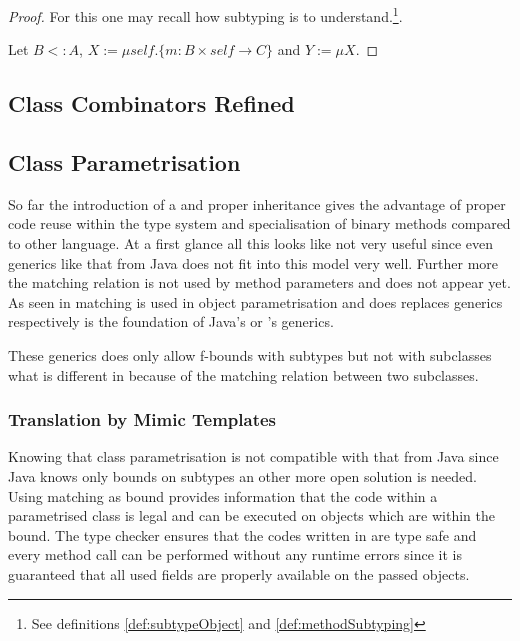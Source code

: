 \begin{proof}
	For this one may recall how subtyping is to understand.\footnote{See
	definitions \ref{def:subtypeObject} and \ref{def:methodSubtyping}}.

	Let $B <: A$, $X := \mu self.\{m :
	B \times self \rightarrow C \} $ and $Y := \mu X.  $

%
\end{proof}


\subsection{Class Combinators Refined}

\subsection{Class Parametrisation}
So far the introduction of a \mytype and proper inheritance gives the
advantage of proper code reuse within the type system and specialisation
of binary methods compared to other language. At a first glance all
this looks like not very useful since even generics like that from
Java does not fit into this model very well. Further more the matching
relation is not used by method parameters and does not appear yet. As
seen in  matching is used in object
parametrisation and does replaces generics respectively is the foundation
of Java's or \cs's generics.

These generics does only allow f-bounds with subtypes but not with
subclasses what is different in \ooplss because of the matching relation
between two subclasses.

\subsubsection{Translation by Mimic Templates}
Knowing that \ooplss class parametrisation is not compatible with that
from Java since Java knows only bounds on subtypes an other more open
solution is needed.  Using matching as bound provides information that
the code within a parametrised class is legal and can be executed on
objects which are within the bound. The type checker ensures that the
codes written in \ooplss are type safe and every method call can be
performed without any runtime errors since it is guaranteed that all
used fields are properly available on the passed objects.


